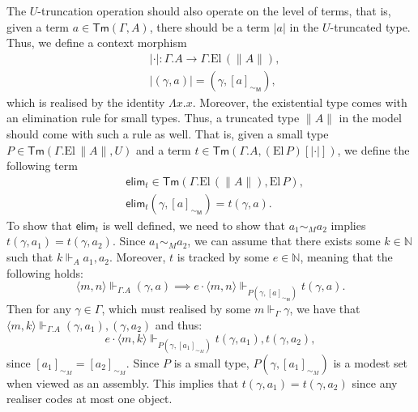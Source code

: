 \documentclass[10pt,a4paper]{article}
\theoremstyle{definition}
\theoremstyle{remark}
\renewcommand{\.}{.\,} %
\renewcommand{\:}{:} %
\newcommand{\bN}{\mathbb{N}}
\newcommand{\El}{\mathrm{El}\,}
\newcommand{\0}{\mathbf{0}}
\newcommand{\1}{\mathbf{1}}
\newcommand\<\langle
\renewcommand\>\rangle
\newcommand{\M}{\mathsf{M}}
\newcommand{\Tr}[1]{{\|{#1}\|}}
\newcommand{\tr}[1]{|{#1}|}
\newcommand{\elim}{\mathsf{elim}}
\newcommand{\Tm}{\mathsf{Tm}}
\newcommand{\U}{U}
\theoremstyle{remark}
\begin{document}
The $U$-truncation operation should also operate on the level of terms, that is, given a term $a \in \Tm(\Gamma, A)$, there should be a term $\tr{a}$ in the $U$-truncated type. Thus, we define a context morphism 
\begin{align*}
	&\tr{\cdot} : \Gamma.A \to \Gamma.\El (\Tr A), \\
	&\tr{(\gamma, a)} = (\gamma, [a]_{\sim_\M}),
\end{align*}
which is realised by the identity $\Lambda x . x$.
Moreover, the existential type comes with an elimination rule for small types. Thus, a truncated type $\Tr A$ in the model should come with such a rule as well. That is, given a small type $P \in \Tm(\Gamma.\El \Tr A, \U)$ and a term $t \in \Tm(\Gamma.A, (\El P)[\tr \cdot ])$, we define the following term
\begin{align*}
	&\elim_t \in \Tm (\Gamma.\El (\Tr A), \El P), \\
	&\elim_t (\gamma, [a]_{\sim_\M}) = t(\gamma, a).
\end{align*}
To show that $\elim_t$ is well defined, we need to show that $a_1 \sim_M a_2$ implies $t(\gamma, a_1) = t(\gamma, a_2)$. Since $a_1 \sim_M a_2$, we can assume that there exists some $k \in \bN$ such that $k \Vdash_A a_1, a_2$. Moreover, $t$ is tracked by some $e \in \bN$, meaning that the following holds:
\[
\langle m, n \rangle \Vdash_{\Gamma.A} (\gamma, a) \implies e \cdot \langle m, n \rangle \Vdash_{P(\gamma, [a]_{\sim_\M})} t(\gamma, a).
\]
Then for any $\gamma \in \Gamma$, which must realised by some $m \Vdash_\Gamma \gamma$, we have that $\langle m, k \rangle \Vdash_{\Gamma.A} (\gamma, a_1), (\gamma, a_2)$ and thus:
\[
e \cdot \langle m, k \rangle \Vdash_{P(\gamma, [a_1]_{\sim_M})} t(\gamma, a_1), t(\gamma, a_2), 
\]
since $[a_1]_{\sim_M} = [a_2]_{\sim_M}$. Since $P$ is a small type, $P(\gamma, [a_1]_{\sim_M})$ is a modest set when viewed as an assembly. This implies that $t(\gamma, a_1) = t(\gamma, a_2) $ since any realiser codes at most one object. 
\end{document}
